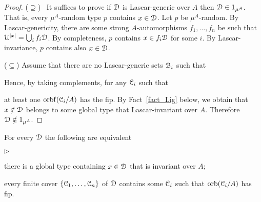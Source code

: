 \documentclass{amsproc}
\newcommand{\mylabel}[1]{{#1}\hfill}
\renewenvironment{itemize}
  {\begin{list}{$\triangleright$}{%
  \setlength{\parskip}{0mm}
  \setlength{\topsep}{.4\baselineskip}
  \setlength{\rightmargin}{0mm}
  \setlength{\listparindent}{0mm}
  \setlength{\itemindent}{0mm}
  \setlength{\labelwidth}{3ex}
  \setlength{\itemsep}{.2\baselineskip}
  \setlength{\parsep}{.2\baselineskip}
  \setlength{\partopsep}{0mm}
  \setlength{\labelsep}{1ex}
  \setlength{\leftmargin}{\labelwidth+\labelsep}
  \let\makelabel\mylabel}}{%
\end{list}}
\begin{document}
\begin{proof}
  ($\supseteq$) \ It suffices to prove if $\EuScript D$ is Lascar-generic over $A$ then $\EuScript D\in1_{\mu^A}$.
  That is, every $\mu^A$-random type $p$ contains $x\in\EuScript D$.
  Let $p$ be $\mu^A$-random.
  By Lascar-genericity, there are some strong $A$-automorphisms $f_1,\dots,f_n$ be such that $\EuScript U^{|x|}=\bigcup_i f_i\EuScript D$.
  By completeness, $p$ contains $x\in f_i\EuScript D$ for some $i$.
  By Lascar-invariance, $p$ contains also $x\in\EuScript D$.

  ($\subseteq$) Assume that there are no Lascar-generic sets $\EuScript B_i$ such that 


  Hence, by taking complements, for any $\EuScript C_i$ such that 
  

  at least one ${\rm orbf}(\EuScript C_i/A)$ has the fip.
  By Fact~\ref{fact_Lig} below, we obtain that $x\notin\EuScript D$ belongs to some global type that Lascar-invariant over $A$.
  Therefore $\EuScript D\notin1_{\mu^A}$.
\end{proof}

\begin{fact}
  For every $\EuScript D$ the following are equivalent
  \begin{itemize}
    \item [1.] there is a global type containing $x\in\EuScript D$ that is invariant over $A$;
    \item [2.] every finite cover  $\{\EuScript C_1,\dots,\EuScript C_n\}$ of $\EuScript D$ contains some $\EuScript C_i$ such that ${\rm orb}(\EuScript C_i/A)$ has fip.
  \end{itemize}
\end{fact}
\end{document}

